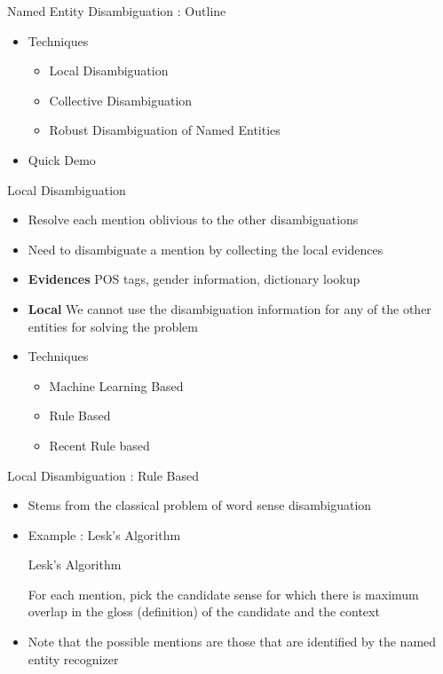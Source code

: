 \begin{frame}{Named Entity Disambiguation : Outline}
 \begin{itemize}
  \item Techniques
  \begin{itemize}
   \item Local Disambiguation \medskip
   \item Collective Disambiguation \medskip
   \item Robust Disambiguation of Named Entities \medskip
  \end{itemize}
  \item Quick Demo
 \end{itemize}

\end{frame}
\begin{frame}{Local Disambiguation}
 \begin{itemize}
  \item Resolve each mention oblivious to the other disambiguations \medskip
  \item Need to disambiguate a mention by collecting the local evidences \medskip
  \item \textbf{Evidences}  POS tags, gender information, dictionary lookup \medskip
  \item \textbf{Local}  We cannot use the disambiguation information for any of the other entities for solving the problem \medskip
  \item Techniques
  \begin{itemize} 
  \item Machine Learning Based
  \item Rule Based
  \item Recent Rule based 
 \end{itemize}
 \end{itemize}
 

\end{frame}
\begin{frame}{Local Disambiguation : Rule Based}
\begin{itemize}
 \item Stems from the classical problem of word sense disambiguation \medskip
 \item Example : Lesk's Algorithm \medskip
  \begin{block}{Lesk's Algorithm} \medskip
       
 For each mention, pick the candidate sense for which there is maximum overlap
 in the gloss (definition) of the candidate and the context
\end{block}
\item Note that the possible mentions are those that are identified by the named entity recognizer
 \end{itemize}

 
\end{frame}


